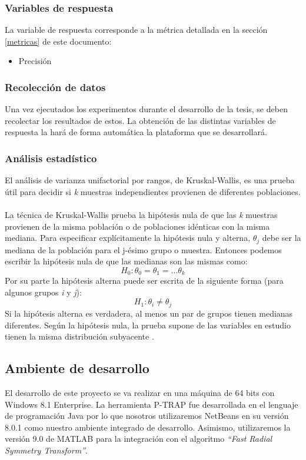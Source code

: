 \subsubsection{Variables de respuesta}
La variable de respuesta corresponde a la m\'etrica detallada en la secci\'on \ref{metricas} de este documento:
\begin{itemize}
\item Precisi\'on
\end{itemize}
\subsubsection{Recolecci\'on de datos}
Una vez ejecutados los experimentos durante el desarrollo de la tesis, se deben recolectar los resultados de estos. La obtenci\'on de las distintas variables de respuesta la har\'a de forma autom\'atica la plataforma que se desarrollar\'a. 
\subsubsection{An\'alisis estad\'istico}
El an\'alisis de varianza unifactorial por rangos, de Kruskal-Wallis\cite{kruskalwallis}, es una prueba \'util para decidir si \textit{k} muestras independientes provienen de diferentes poblaciones.
\\\\
La t\'ecnica de Kruskal-Wallis\cite{kruskalwallis} prueba la hip\'otesis nula de que las \textit{k} muestras provienen de la misma poblaci\'on o de poblaciones id\'enticas con la misma mediana. Para especificar expl\'icitamente la hip\'otesis nula y alterna, $\theta_j$ debe ser la mediana de la poblaci\'on para el j-\'esimo grupo o muestra.
Entonces podemos escribir la hip\'otesis nula de que las medianas son las mismas como:
\[H_0 : \theta_0 = \theta_1 = ...\theta_k \] 
Por su parte la hip\'otesis alterna puede ser escrita de la siguiente forma (para algunos grupos \textit{i} y \textit{j}):
\[H_1 : \theta_i \neq \theta_j \] 
Si la hip\'otesis alterna es verdadera, al menos un par de grupos tienen medianas diferentes. Seg\'un la hip\'otesis nula, la prueba supone de las variables en estudio tienen la misma distribuci\'on subyacente \cite{monicamontano}.
\subsection{Ambiente de desarrollo}
El desarrollo de este proyecto se va realizar en una m\'aquina de 64 bits con Windows 8.1 Enterprise. La herramienta P-TRAP\cite{ptrap} fue desarrollada en el lenguaje de programaci\'on Java por lo que nosotros utilizaremos NetBeans \cite{netbeans} en su versi\'on 8.0.1 como nuestro ambiente integrado de desarrollo. Asimismo, utilizaremos la versi\'on 9.0 de MATLAB \cite{matlab} para la integraci\'on con el algoritmo \textit{“Fast Radial Symmetry Transform”}\cite{loyzelinsky}.
